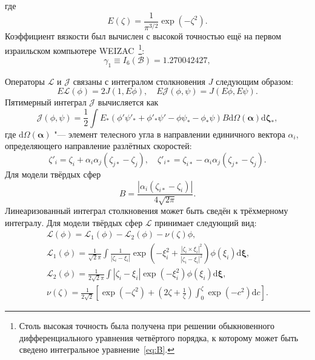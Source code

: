 \documentclass[a4paper,12pt]{article}
\newcommand{\dd}{\mathrm{d}}
\begin{document}
где
\begin{equation}\label{eq:E}
    E(\zeta) = \frac1{\pi^{3/2}}\exp\left(-\zeta^2\right).
\end{equation}
Коэффициент вязкости был вычислен с высокой точностью ещё на первом израильском компьютере WEIZAC~\cite{Pekeris1957}\footnote{
    Столь высокая точность была получена при решении обыкновенного дифференциального уравнения четвёртого порядка,
    к которому может быть сведено интегральное уравнение~\eqref{eq:B}.
}:
\begin{equation}\label{eq:gamma1}
    \gamma_1 \equiv I_6(\mathcal{B}) = 1.270042427,
\end{equation}

Операторы \(\mathcal{L}\) и \(\mathcal{J}\) связаны с интегралом столкновения \(J\) следующим образом:
\begin{equation}\label{eq:mathcalLJ}
    E\mathcal{L}(\phi) = 2J(1, E\phi), \quad E\mathcal{J}(\phi, \psi) = J(E\phi, E\psi).
\end{equation}
Пятимерный интеграл \(\mathcal{J}\) вычисляется как
\begin{equation}\label{eq:mathcalJ}
    \mathcal{J}(\phi,\psi) = \frac12 \int E_*(\phi'\psi'_* + \phi'_*\psi' - \phi\psi_* - \phi_*\psi) B
    \dd \Omega(\boldsymbol{\alpha}) \boldsymbol{\dd \zeta_*},
\end{equation}
где \(\dd \Omega(\boldsymbol{\alpha})\) "--- элемент телесного угла в направлении единичного вектора \(\alpha_i\),
определяющего направление разлётных скоростей:
\begin{equation}\label{scatter_velocities}
    \zeta'_i = \zeta_i + \alpha_i\alpha_j(\zeta_{j*}-\zeta_j), \quad
    \zeta'_{i*} = \zeta_{i*} - \alpha_i\alpha_j(\zeta_{j*}-\zeta_j).
\end{equation}
Для модели твёрдых сфер
\begin{equation}
    B = \frac{|\alpha_i(\zeta_{i*}-\zeta_i)|}{4\sqrt{2\pi}}.
\end{equation}
Линеаризованный интеграл столкновения может быть сведён к трёхмерному интегралу.
Для модели твёрдых сфер \(\mathcal{L}\) принимает следующий вид:
\begin{gather}\label{eq:linear_canonic}
    \mathcal{L}(\phi) = \mathcal{L}_1(\phi) - \mathcal{L}_2(\phi) - \nu(\zeta)\phi, \\[6pt]
    \mathcal{L}_1(\phi) = \frac1{\sqrt2\pi} \int \frac1{|\zeta_i-\xi_i|}
        \exp\left(-\xi_i^2 + \frac{|\zeta_i\times\xi_i|^2}{|\zeta_i-\xi_i|^2}\right) \phi(\xi_i) \boldsymbol{\dd\xi}, \\
    \mathcal{L}_2(\phi) = \frac1{2\sqrt2\pi} \int |\zeta_i-\xi_i|\exp\left(-\xi_i^2\right) \phi(\xi_i) \boldsymbol{\dd\xi}, \\
    \nu(\zeta) = \frac1{2\sqrt2}\left[ \exp(-\zeta^2) + \left(2\zeta+\frac1\zeta\right) \int_0^\zeta\exp(-c^2)\dd{c} \right].
\end{gather}
\end{document}

